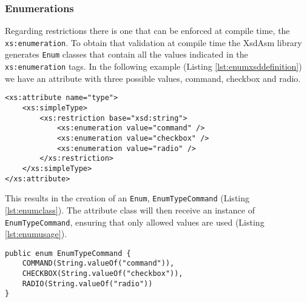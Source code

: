 \subsubsection{Enumerations}
\label{sec:enumarations}

Regarding restrictions there is one that can be enforced at compile time, the \texttt{xs:enumeration}. To obtain that validation at compile time the XsdAsm library generates \texttt{Enum} classes that contain all the values indicated in the \texttt{xs:enumeration} tags. In the following example (Listing \ref{lst:enumxsddefinition}) we have an attribute with three possible values, command, checkbox and radio.

\bigskip


\begin{minipage}{\linewidth}
\begin{lstlisting}[caption={Enumeration XSD Definition},label={lst:enumxsddefinition}]
<xs:attribute name="type">
    <xs:simpleType>
        <xs:restriction base="xsd:string">
            <xs:enumeration value="command" />
            <xs:enumeration value="checkbox" />
            <xs:enumeration value="radio" />
        </xs:restriction>
    </xs:simpleType>
</xs:attribute>
\end{lstlisting}
\end{minipage}

\newpage

\noindent
This results in the creation of an \texttt{Enum}, \texttt{EnumTypeCommand} (Listing \ref{lst:enumclass}). The attribute class will then receive an instance of \texttt{EnumTypeCommand}, ensuring that only allowed values are used (Listing \ref{lst:enumusage}).

\bigskip


\begin{minipage}{\linewidth}
\begin{lstlisting}[caption={Enumeration Class},label={lst:enumclass}]
public enum EnumTypeCommand {
    COMMAND(String.valueOf("command")), 
    CHECKBOX(String.valueOf("checkbox")),
    RADIO(String.valueOf("radio"))
}
\end{lstlisting}
\end{minipage}


